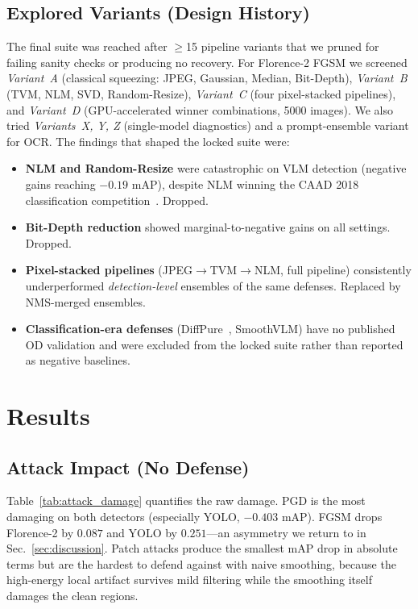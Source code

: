 \documentclass[10pt,twocolumn,letterpaper]{article}
\begin{document}
\subsection{Explored Variants (Design History)}
The final suite was reached after $\geq$15 pipeline variants that we pruned for failing sanity checks or producing no recovery. For Florence-2 FGSM we screened \emph{Variant~A} (classical squeezing: JPEG, Gaussian, Median, Bit-Depth), \emph{Variant~B} (TVM, NLM, SVD, Random-Resize), \emph{Variant~C} (four pixel-stacked pipelines), and \emph{Variant~D} (GPU-accelerated winner combinations, 5000 images). We also tried \emph{Variants~X, Y, Z} (single-model diagnostics) and a prompt-ensemble variant for OCR. The findings that shaped the locked suite were:
\begin{itemize}
\itemsep -0.25em
\item \textbf{NLM and Random-Resize} were catastrophic on VLM detection (negative gains reaching $-0.19$ mAP), despite NLM winning the CAAD 2018 classification competition~\cite{xie2019feature}. Dropped.
\item \textbf{Bit-Depth reduction} showed marginal-to-negative gains on all settings. Dropped.
\item \textbf{Pixel-stacked pipelines} (JPEG$\to$TVM$\to$NLM, full pipeline) consistently underperformed \emph{detection-level} ensembles of the same defenses. Replaced by NMS-merged ensembles.
\item \textbf{Classification-era defenses} (DiffPure~\cite{nie2022diffpure}, SmoothVLM) have no published OD validation and were excluded from the locked suite rather than reported as negative baselines.
\end{itemize}

\section{Results}
\label{sec:results}

\subsection{Attack Impact (No Defense)}
Table~\ref{tab:attack_damage} quantifies the raw damage. PGD is the most damaging on both detectors (especially YOLO, $-0.403$ mAP). FGSM drops Florence-2 by $0.087$ and YOLO by $0.251$---an asymmetry we return to in Sec.~\ref{sec:discussion}. Patch attacks produce the smallest mAP drop in absolute terms but are the hardest to defend against with naive smoothing, because the high-energy local artifact survives mild filtering while the smoothing itself damages the clean regions.
\end{document}
